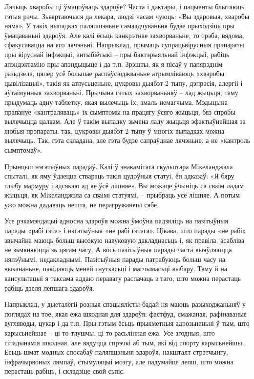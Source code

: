 Лячыць хваробы ці ўмацоўваць здароўе? Часта і дактары, і пацыенты блытаюць гэтыя рэчы. Зьвяртаючыся да лекара, людзі часам чуюць: «Вы здаровыя, хваробы няма». У такіх выпадках паляпшэньне самаадчуваньня будзе прыходзіць пры ўмацаваньні здароўя. Але калі ёсьць канкрэтнае захворваньне, то трэба, вядома, сфакусавацца на яго лячэньні. Напрыклад, прымаць супрацьвірусныя прэпараты пры віруснай інфэкцыі, антыбіётыкі – пры бактэрыяльнай інфэкцыі, рабіць апэндэктамію пры апэндыцыце і да т.п. Зрэшты, як я пісаў у папярэднім разьдзеле, цяпер усё большае распаўсюджваньне атрымліваюць «хваробы цывілізацыі», такія як атлусьценьне, цукровы дыябэт 2 тыпу, дэпрэсія, алергіі і аўтаімунныя захворваньні. Прычына гэтых захворваньняў – лад жыцьця, таму прыдумаць адну таблетку, якая вылечыць іх, амаль немагчыма. Мэдыцына прапануе «кантраляваць» іх сымптомы на працягу ўсяго жыцьця, бяз спробы вылечыцца цалкам. Але ў такім выпадку зьмена ладу жыцьця эфэктыўнейшая за любыя прэпараты: так, цукровы дыябэт 2 тыпу ў многіх выпадках можна вылечыць. Так, гэта складана, але гэта будзе сапраўднае лячэньне, а не «кантроль сымптомаў».

Прынцып нэгатыўных парадаў. Калі ў знакамітага скульптара Мікеланджэла спыталі, як яму ўдаецца ствараць такія цудоўныя статуі, ён адказаў: «Я бяру глыбу мармуру і адсякаю ад яе ўсё лішняе». Вы можаце ўчыніць са сваім ладам жыцьця, як Мікеланджэла са сваімі статуямі, – прыбраць усё лішняе. А потым ужо можна дадаваць нешта, не перагружаючы сябе.

Усе рэкамэндацыі адносна здароўя можна ўмоўна падзяліць на пазітыўныя парады «рабі гэта» і нэгатыўныя «не рабі гэтага». Цікава, што парады «не рабі» звычайна маюць больш высокую навуковую дакладнасьць і, як правіла, асабліва не зьмяняюцца зь цягам часу. А вось пазітыўныя парады часта выяўляюцца няпэўнымі, недакладнымі. Пазітыўныя парады патрабуюць больш часу на выкананьне, пакідаюць меней гнуткасьці і магчымасьці выбару. Таму й на кансультацыі я таксама аддаю перавагу распачаць з таго, што можна перастаць рабіць дзеля лепшага здароўя.

Напрыклад, у дыеталёгіі розныя спэцыялісты бадай ня маюць разыходжаньняў у поглядах на тое, якая ежа шкодная для здароўя: фастфуд, смажаная, рафінаваныя вугляводы, цукар і да т.п. Пры гэтым ёсьць прыкметныя адрозьненьні ў тым, што карысьнейшае – ці то тлушчы, ці то расьлінная ежа. Усе згодныя, што гіпадынамія шкодная, але вядуцца спрэчкі аб тым, які від спорту карысьнейшы. Ёсьць шмат модных спосабаў паляпшэньня здароўя, накшталт стрэтчынгу, інфрачырвоных лямпаў, стымуляцыі мозгу, але падумайце лепш, што можна перастаць рабіць, і складзіце свой сьпіс.

